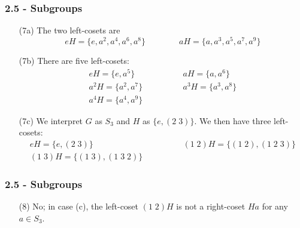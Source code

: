 \documentclass{beamer}
\begin{document}
\begin{frame}
\frametitle{2.5 - Subgroups}
\small
\begin{enumerate}
	\item[(7a)] The two left-cosets are
	\begin{equation*}
	eH = \{e, a^2, a^4, a^6, a^8\}\qquad\qquad aH = \{a, a^3, a^5, a^7, a^9\}
	\end{equation*}
	\item[(7b)] There are five left-cosets:
	\begin{align*}
	eH = \{e, a^5\} \qquad & \qquad aH = \{a, a^6\} \\
	a^2H = \{a^2, a^7\} \qquad & \qquad a^3H = \{a^3, a^8\} \\
	a^4H = \{a^4, a^9\} \qquad & \qquad
	\end{align*}
	\item[(7c)] We interpret $G$ as $S_3$ and $H$ as $\{e, (2\;3)\}$. We then have three left-cosets:
	\begin{align*}
	eH = \{e, (2\;3)\}\qquad & \qquad (1\;2)H = \{(1\;2), (1\;2\;3)\} \\
	(1\;3)H = \{(1\;3), (1\;3\;2)\}\qquad & \qquad
	\end{align*}
\end{enumerate}
\end{frame}
\begin{frame}
\frametitle{2.5 - Subgroups}
\small
\begin{enumerate}
	\item[(8)] No; in case (c), the left-coset $(1\;2)H$ is not a right-coset $Ha$ for any $a\in S_3$.
\end{enumerate}
\end{frame}
\end{document}
